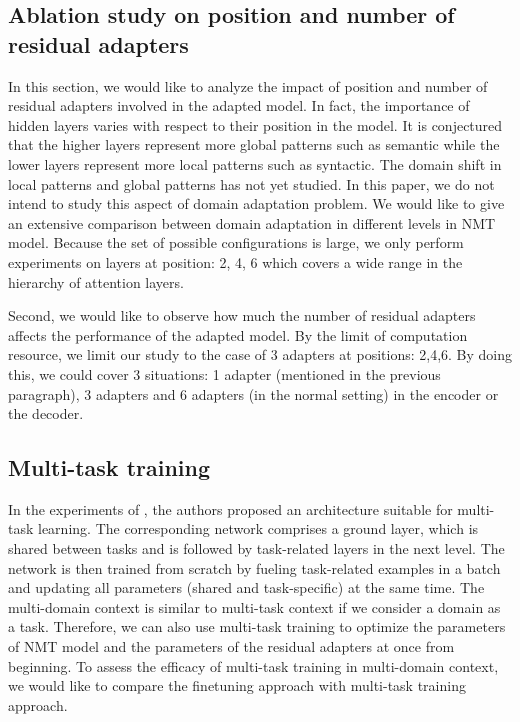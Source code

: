 \documentclass[11pt,a4paper]{article}
\newcommand{\fyTodo}[1]{\Todo[FY:]{\textcolor{orange}{#1}}}
\begin{document}
\subsection{Ablation study on position and number of residual adapters \label{ssec:ablatation}}
\fyTodo{Move this}
In this section, we would like to analyze the impact of position and number of residual adapters involved in the adapted model. In fact, the importance of hidden layers varies with respect to their position in the model. It is conjectured that the higher layers represent more global patterns such as semantic while the lower layers represent more local patterns such as syntactic\fyTodo{Missing reference here}. The domain shift in local patterns and global patterns has not yet studied. In this paper, we do not intend to study this aspect of domain adaptation problem. We would like to give an extensive comparison between domain adaptation in different levels in NMT model.\fyTodo{Fix style here} Because the set of possible configurations is large, we only perform experiments on layers at position: 2, 4, 6 which covers a wide range in the hierarchy of attention layers. 

Second, we would like to observe how much the number of residual adapters affects the performance of the adapted model. By the limit of computation resource, we limit our study to the case of 3 adapters at positions: 2,4,6. By doing this, we could cover 3 situations: 1 adapter (mentioned in the previous paragraph), 3 adapters and 6 adapters (in the normal setting) in the encoder or the decoder.\fyTodo{We have 12 layers, have we not ?}

\subsection{Multi-task training\label{ssec:multitask}}
In the experiments of \cite{Caruana97multitask}, the authors proposed an architecture suitable for multi-task learning. The corresponding network comprises a ground layer, which is shared between tasks and is followed by task-related layers in the next level. The network is then trained from scratch by fueling task-related examples in a batch and updating all parameters (shared and task-specific) at the same time. The multi-domain context is similar to multi-task context if we consider a domain as a task\cite{Dredze08}. Therefore, we can also use multi-task training to optimize the parameters of NMT model and the parameters of the residual adapters at once from beginning. To assess the efficacy of multi-task training in multi-domain context, we would like to compare the finetuning approach with multi-task training approach. \fyTodo{Change the training regime}
\end{document}
